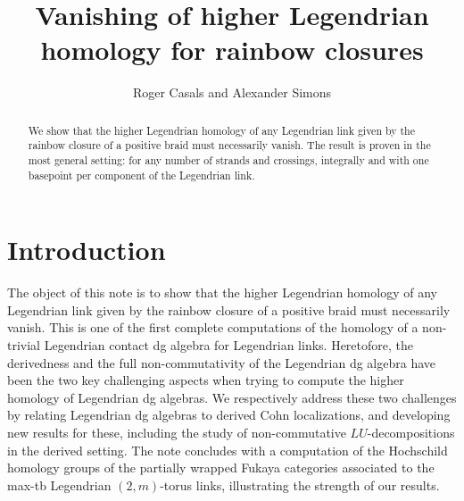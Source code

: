 \documentclass[11pt]{article}
\title{{Vanishing of higher Legendrian homology for rainbow closures}}
\author{Roger Casals and Alexander Simons}
\date{}
\begin{document}
\maketitle

\begin{abstract}
We show that the higher Legendrian homology of any Legendrian link given by the rainbow closure of a positive braid must necessarily vanish. The result is proven in the most general setting: for any number of strands and crossings, integrally and with one basepoint per component of the Legendrian link.
\end{abstract}

\tableofcontents

\section{Introduction}\label{sec:intro}

The object of this note is to show that the higher Legendrian homology of any Legendrian link given by the rainbow closure of a positive braid must necessarily vanish. This is one of the first complete computations of the homology of a non-trivial Legendrian contact dg algebra for Legendrian links. Heretofore, the derivedness and the full non-commutativity of the Legendrian dg algebra have been the two key challenging aspects when trying to compute the higher homology of Legendrian dg algebras. We respectively address these two challenges by relating Legendrian dg algebras to derived Cohn localizations, and developing new results for these, including the study of non-commutative $LU$-decompositions in the derived setting. The note concludes with a computation of the Hochschild homology groups of the partially wrapped Fukaya categories associated to the max-tb Legendrian $(2,m)$-torus links, illustrating the strength of our results.

\end{document}
